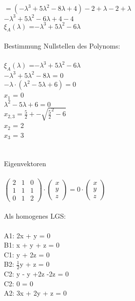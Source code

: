 \documentclass{article}
\begin{document}
	$
	=
	(-\lambda^{3}+ 5\lambda^{2}- 8\lambda + 4) -2 + \lambda - 2 + \lambda$ \\	
	$
	-\lambda^{3}+ 5\lambda^{2} - 6\lambda + 4 - 4$ \\
	$\xi_{A}(\lambda)$ =$ -\lambda^{3}+ 5\lambda^{2}- 6\lambda$ \\ \\
	Bestimmung Nullstellen des Polynoms: \\ \\
	$\xi_{A}(\lambda)$ =$ -\lambda^{3}+ 5\lambda^{2}- 6\lambda$ \\
	$-\lambda^{3}+ 5\lambda^{2}- 8\lambda$ = 0 \\
	$-\lambda \cdot (\lambda^{2} - 5\lambda + 6) = 0$ \\
	$x_1$ = 0 \\
	$\lambda^{2} - 5\lambda + 6 = 0$  \\
	$x_{2, 3} = \frac{5}{2} +- \sqrt{\frac{5}{2}^2 - 6}$ \\
	$x_2$ = 2 \\
	$x_3$ = 3 \\
	\\
	\\
	Eigenvektoren \\
	\\
	$
	\left(
	\begin{array}{ccc}
	2&1&0 \\ 1&1&1 \\ 0&1&2 
	\end{array}
	\right)
	\cdot
	\left(
	\begin{array}{c}
	x \\ y \\ z
	\end{array}
	\right)
	=
	0 \cdot
	\left(
	\begin{array}{c}
	x \\ y \\ z
	\end{array}
	\right)
	$ \\ \\
	Als homogenes LGS: \\ \\
	A1: 2x + y  = 0\\
	B1: x + y + z = 0\\
	C1: y + 2z = 0\\
	B2: $\frac{1}{2}$y + z = 0 \\
	C2: y - y +2z -2z = 0 \\
	C2: 0 = 0 \\ 
	A2: 3x + 2y + z = 0 \\ \\
\end{document}
